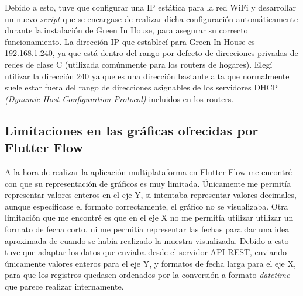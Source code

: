     Debido a esto, tuve que configurar una IP estática para la red WiFi y desarrollar un nuevo \textit{script} que se encargase de realizar dicha configuración automáticamente durante la instalación de Green In House, para asegurar su correcto funcionamiento. La dirección IP que establecí para Green In House es 192.168.1.240, ya que está dentro del rango por defecto de direcciones privadas de redes de clase C (utilizada comúnmente para los routers de hogares). Elegí utilizar la dirección 240 ya que es una dirección bastante alta que normalmente suele estar fuera del rango de direcciones asignables de los servidores DHCP \textit{(Dynamic Host Configuration Protocol)} incluidos en los routers.

    \subsection{Limitaciones en las gráficas ofrecidas por Flutter Flow}
    A la hora de realizar la aplicación multiplataforma en Flutter Flow me encontré con que su representación de gráficos es muy limitada. Únicamente me permitía representar valores enteros en el eje Y, si intentaba representar valores decimales, aunque especificase el formato correctamente, el gráfico no se visualizaba. Otra limitación que me encontré es que en el eje X no me permitía utilizar utilizar un formato de fecha corto, ni me permitía representar las fechas para dar una idea aproximada de cuando se había realizado la muestra visualizada. Debido a esto tuve que adaptar los datos que enviaba desde el servidor API REST, enviando únicamente valores enteros para el eje Y, y formatos de fecha larga para el eje X, para que los registros quedasen ordenados por la conversión a formato \textit{datetime} que parece realizar internamente.
